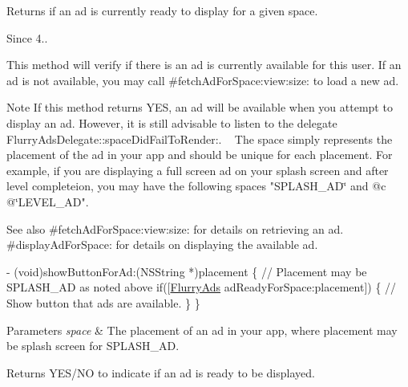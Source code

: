 Returns if an ad is currently ready to display for a given {\ttfamily space}. 

\begin{DoxySince}{Since}
4..
\end{DoxySince}
This method will verify if there is an ad is currently available for this user. If an ad is not available, you may call \#fetch\+Ad\+For\+Space\+:view\+:size\+: to load a new ad.

\begin{DoxyNote}{Note}
If this method returns Y\+ES, an ad will be available when you attempt to display an ad. However, it is still advisable to listen to the delegate Flurry\+Ads\+Delegate\+::space\+Did\+Fail\+To\+Render\+:. ~\newline
The {\ttfamily space} simply represents the placement of the ad in your app and should be unique for each placement. For example, if you are displaying a full screen ad on your splash screen and after level completeion, you may have the following spaces {\ttfamily "S\+P\+L\+A\+S\+H\+\_\+\+AD\char`\"{} and @c @\char`\"{}L\+E\+V\+E\+L\+\_\+\+AD"}.
\end{DoxyNote}
\begin{DoxySeeAlso}{See also}
\#fetch\+Ad\+For\+Space\+:view\+:size\+: for details on retrieving an ad.~\newline
 \#display\+Ad\+For\+Space\+: for details on displaying the available ad.
\end{DoxySeeAlso}

\begin{DoxyCode}
   - (void)showButtonForAd:(NSString *)placement 
\{
\textcolor{comment}{// Placement may be SPLASH\_AD as noted above}
\textcolor{keywordflow}{if}([\hyperlink{interfaceFlurryAds}{FlurryAds} adReadyForSpace:placement]) 
\{
\textcolor{comment}{// Show button that ads are available.}
\}
\}
\end{DoxyCode}



\begin{DoxyParams}{Parameters}
{\em space} & The placement of an ad in your app, where placement may be splash screen for S\+P\+L\+A\+S\+H\+\_\+\+AD.\\
\hline
\end{DoxyParams}
\begin{DoxyReturn}{Returns}
Y\+E\+S/\+NO to indicate if an ad is ready to be displayed. 
\end{DoxyReturn}
\mbox{\label{interfaceFlurryAds_a4126bd3f3c8d8b48e77f5b6eb2788e78}} 
